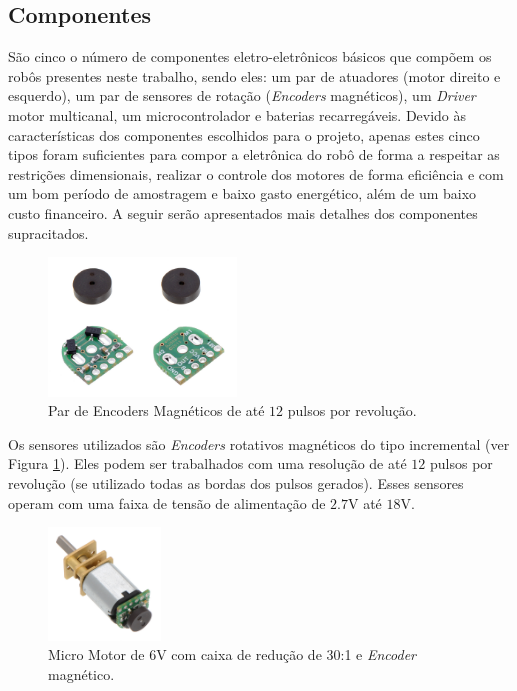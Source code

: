 \subsection{Componentes}
\label{subsec:componentes}

São cinco o número de componentes eletro-eletrônicos básicos que compõem os robôs presentes neste trabalho, sendo eles: um par de atuadores (motor direito e esquerdo), um par de sensores de rotação (\textit{Encoders} magnéticos), um \emph{Driver} motor multicanal, um microcontrolador e baterias recarregáveis. Devido às características dos componentes escolhidos para o projeto, apenas estes cinco tipos foram suficientes para compor a eletrônica do robô de forma a respeitar as restrições dimensionais, realizar o controle dos motores de forma eficiência e com um bom período de amostragem e baixo gasto energético, além de um baixo custo financeiro. A seguir serão apresentados mais detalhes dos componentes supracitados.\\

\begin{figure}[H]
    \centering
    \includegraphics[width=5cm]{figuras/eletronica/encoder_frente_verso.jpg}
    \caption{Par de Encoders Magnéticos de até $12$ pulsos por revolução.}
    \label{fig:encoder}
\end{figure}

Os sensores utilizados são \emph{Encoders} rotativos magnéticos do tipo incremental (ver Figura \ref{fig:encoder}). Eles podem ser trabalhados com uma resolução de até $12$ pulsos por revolução (se utilizado todas as bordas dos pulsos gerados). Esses sensores operam com uma faixa de tensão de alimentação de $2.7$V até $18$V.\\

\begin{figure}[H]
    \centering
    \includegraphics[width=3cm]{figuras/eletronica/motor_com_encoder.jpg}
    \caption{Micro Motor de 6V com caixa de redução de 30:1 e \textit{Encoder} magnético.}
    \label{fig:motor_com_encoder}
\end{figure}

